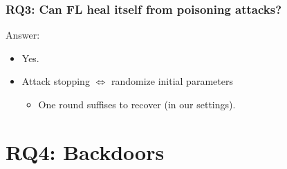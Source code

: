 \documentclass[color,t,presentation,english,aspectratio=169]{beamer}
\begin{document}
\begin{frame}
\frametitle{RQ3: Can FL heal itself from poisoning attacks?}
Answer:
\begin{itemize}
	\item Yes.
	\item Attack stopping $\Longleftrightarrow$ randomize initial parameters
	\begin{itemize}
		\item One round suffises to recover (in our settings).
	\end{itemize}
\end{itemize}
\end{frame}

\section{RQ4: Backdoors}
\end{document}
